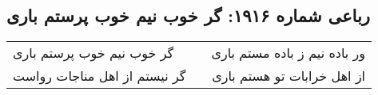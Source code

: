 \begin{center}
\section*{رباعی شماره ۱۹۱۶: گر خوب نیم خوب پرستم باری}
\label{sec:1916}
\begin{longtable}{l p{0.5cm} r}
گر خوب نیم خوب پرستم باری
&&
ور باده نیم ز باده مستم باری
\\
گر نیستم از اهل مناجات رواست
&&
از اهل خرابات تو هستم باری
\\
\end{longtable}
\end{center}
